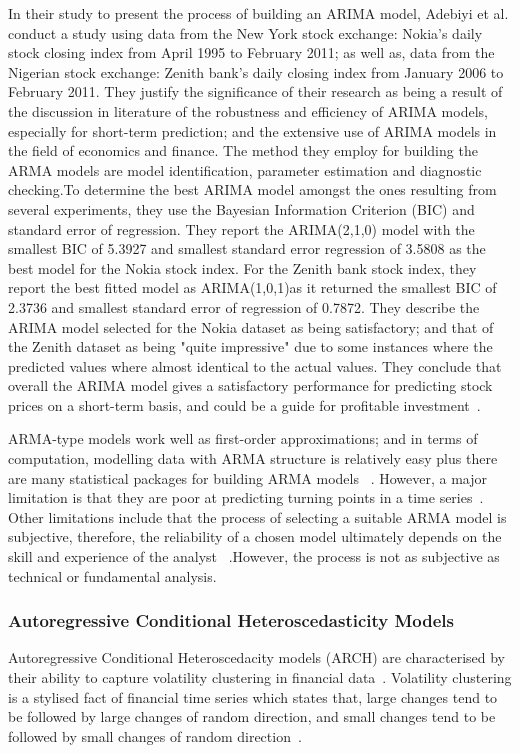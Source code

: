 \documentclass[13pt]{report}
\begin{document}
In their study to present the process of building an ARIMA model, Adebiyi et al. conduct a study using data from the New York stock exchange: Nokia's daily stock closing index from April 1995 to February 2011; as well as, data from the Nigerian stock exchange: Zenith bank's daily closing index from January 2006 to February 2011. They justify the significance of their research as being a result of the discussion in literature of the robustness and efficiency of ARIMA models, especially for short-term prediction; and the extensive use of ARIMA models in the field of economics and finance. The method they employ for building the ARMA models are model identification, parameter estimation and diagnostic checking.To determine the best ARIMA model amongst the ones resulting from several experiments, they use the Bayesian Information Criterion (BIC) and standard error of regression. They report the ARIMA(2,1,0) model with the smallest BIC of 5.3927 and smallest standard error regression of 3.5808 as the best model for the Nokia stock index. For the Zenith bank stock index, they report the best fitted model as ARIMA(1,0,1)as it returned the smallest BIC of 2.3736 and smallest standard error of regression of 0.7872. They describe the ARIMA model selected for the Nokia dataset as being satisfactory; and that of the Zenith dataset as being "quite impressive" due to some instances where the predicted values where almost identical to the actual values. They conclude that overall the ARIMA model gives a satisfactory performance for predicting stock prices on a short-term basis, and could be a guide for profitable investment~\cite{activitiesariyo2014stock}.

ARMA-type models work well as first-order approximations; and in terms of computation, modelling data with ARMA structure is relatively easy plus there are many statistical packages for building ARMA models ~\cite{satchell2011forecasting}. However, a major limitation is that they are poor at predicting turning points in a time series~\cite{zhai2009time,meyler1998forecasting}. Other limitations include that the process of selecting a suitable ARMA model is subjective, therefore, the reliability of a chosen model ultimately depends on the skill and experience of the analyst ~\cite{zhai2009time}.However, the process is  not as subjective as technical or fundamental analysis.

\subsubsection{Autoregressive Conditional Heteroscedasticity Models}
Autoregressive Conditional Heteroscedacity models (ARCH) are characterised by their ability to capture volatility clustering in financial data~\cite{satchell2011forecasting}. Volatility clustering is a stylised fact of financial time series which states that, large changes tend to be followed by large changes of random direction, and small changes tend to be followed by small changes of random direction~\cite{mandelbrot1997variation}.\par
\end{document}
